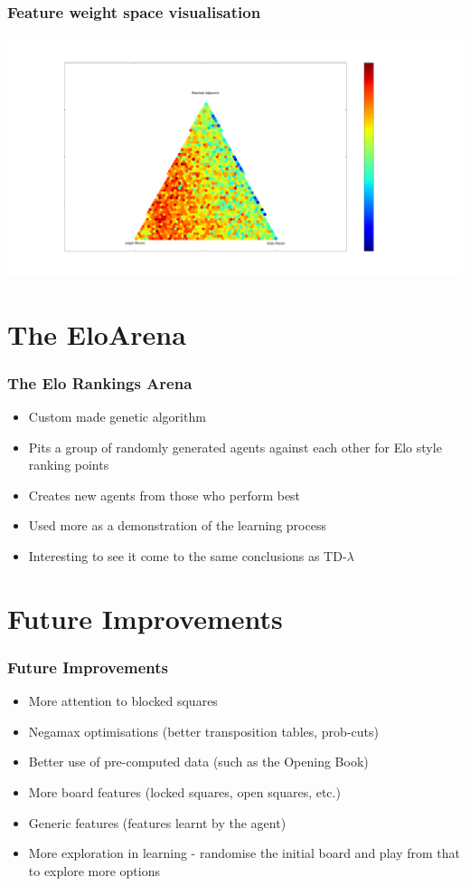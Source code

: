 \documentclass[10pt]{beamer}
\begin{document}
\begin{frame}
  \frametitle{Feature weight space visualisation}
  \begin{center} \includegraphics[trim= 12cm 4cm 23cm 7cm, clip, height=7cm]{Graphs/LegalMoves_BlockedAdjacent_SidePieces_Triangle.pdf}  \end{center} 
\end{frame}

\section{The EloArena}

\begin{frame}
  \frametitle{The Elo Rankings Arena}
  \begin{itemize}
  \item<1-> Custom made genetic algorithm
  \item<1-> Pits a group of randomly generated agents against each other for Elo style ranking points
  \item<1-> Creates new agents from those who perform best
  \item<2-> Used more as a demonstration of the learning process
  \item<2-> Interesting to see it come to the same conclusions as TD-$\lambda$
  \end{itemize}
\end{frame}

\section{Future Improvements}

\begin{frame}
  \frametitle{Future Improvements}
  \begin{itemize}
  \item<1-> More attention to blocked squares
  \item<2-> Negamax optimisations (better transposition tables, prob-cuts)
  \item<3-> Better use of pre-computed data (such as the Opening Book)
  \item<4-> More board features (locked squares, open squares, etc.)
  \item<5-> Generic features (features learnt by the agent)
  \item<6-> More exploration in learning - randomise the initial board and play from that to explore more options
  \end{itemize}
\end{frame}
\end{document}
